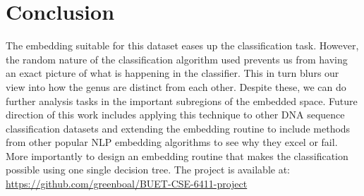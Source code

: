 \documentclass[oneside, twocolumn, a4paper, 10pt]{IEEEtran}
\begin{document}
\section{Conclusion}
The embedding suitable for this dataset eases up the classification task. However, the random nature of the classification algorithm used prevents us from having an exact picture of what is happening in the classifier. This in turn blurs our view into how the genus are distinct from each other. Despite these, we can do further analysis tasks in the important subregions of the embedded space. Future direction of this work includes applying this technique to other DNA sequence classification datasets and extending the embedding routine to include methods from other popular NLP embedding algorithms to see why they excel or fail. More importantly to design an embedding routine that makes the classification possible using one single decision tree. The project is available at: \url{https://github.com/greenboal/BUET-CSE-6411-project}
%
\end{document}
